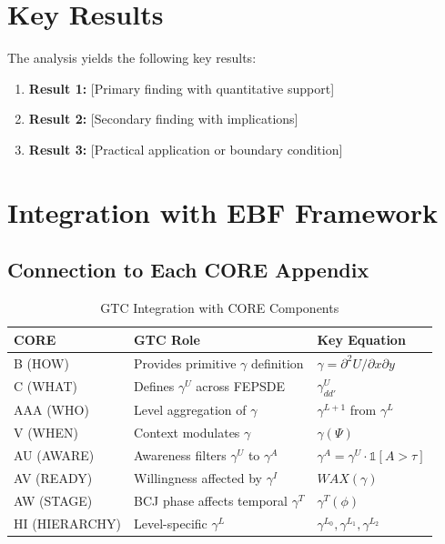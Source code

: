 
\section{Key Results}
\label{sec:gtc-results}

The analysis yields the following key results:

\begin{enumerate}
    \item \textbf{Result 1:} [Primary finding with quantitative support]
    \item \textbf{Result 2:} [Secondary finding with implications]
    \item \textbf{Result 3:} [Practical application or boundary condition]
\end{enumerate}


\section{Integration with EBF Framework}
\label{sec:gtc-integration}

\subsection{Connection to Each CORE Appendix}

\begin{table}[H]
\centering
\caption{GTC Integration with CORE Components}
\label{tab:gtc-core-integration}
\renewcommand{\arraystretch}{1.4}
\begin{tabular}{@{}lll@{}}
\toprule
\textbf{CORE} & \textbf{GTC Role} & \textbf{Key Equation} \\
\midrule
B (HOW) & Provides primitive $\gamma$ definition & $\gamma = \partial^2 U / \partial x \partial y$ \\
C (WHAT) & Defines $\gamma^U$ across FEPSDE & $\gamma^U_{dd'}$ \\
AAA (WHO) & Level aggregation of $\gamma$ & $\gamma^{L+1}$ from $\gamma^L$ \\
V (WHEN) & Context modulates $\gamma$ & $\gamma(\Psi)$ \\
AU (AWARE) & Awareness filters $\gamma^U$ to $\gamma^A$ & $\gamma^A = \gamma^U \cdot \mathbb{1}[A > \tau]$ \\
AV (READY) & Willingness affected by $\gamma^I$ & $WAX(\gamma)$ \\
AW (STAGE) & BCJ phase affects temporal $\gamma^T$ & $\gamma^T(\phi)$ \\
HI (HIERARCHY) & Level-specific $\gamma^L$ & $\gamma^{L_0}, \gamma^{L_1}, \gamma^{L_2}$ \\
\bottomrule
\end{tabular}
\end{table}

